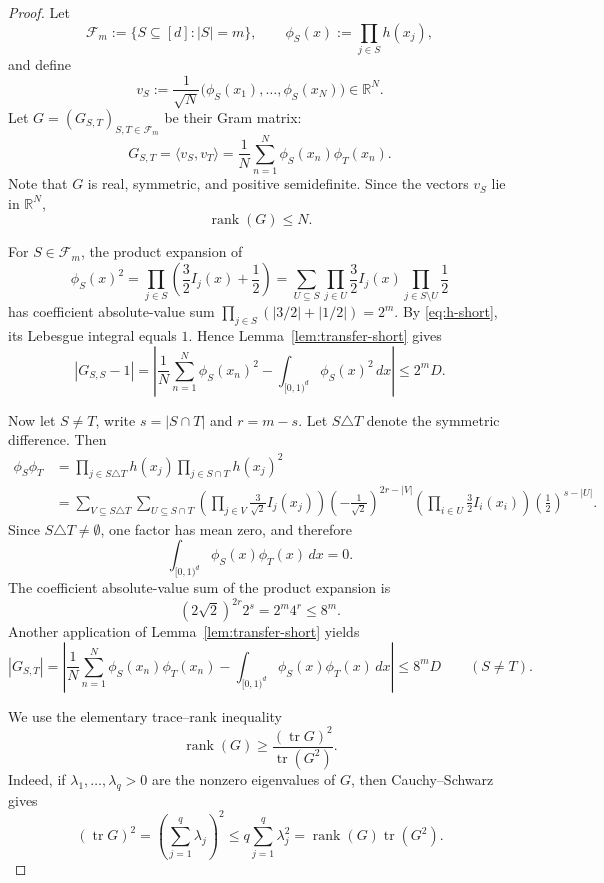 \documentclass[10pt,a4paper]{amsart}
\newcommand{\1}{\mathbf{1}}
\newcommand{\R}{\mathbb{R}}
\newcommand{\tr}{\operatorname{tr}}
\newcommand{\rank}{\operatorname{rank}}
\begin{document}
\begin{proof}
Let
\[
 \mathcal F_m:=\{S\subseteq[d]:|S|=m\},
 \qquad
 \phi_S(x):=\prod_{j\in S}h(x_j),
\]
and define
\[
 v_S:=\frac1{\sqrt N}
 \bigl(\phi_S(x_1),\dots,\phi_S(x_N)\bigr)\in\R^N.
\]
Let \(G=(G_{S,T})_{S,T\in\mathcal F_m}\) be their Gram matrix:
\[
 G_{S,T}
 =
 \langle v_S,v_T\rangle
 =
 \frac1N\sum_{n=1}^N\phi_S(x_n)\phi_T(x_n).
\] 
Note that $G$ is real, symmetric, and positive semidefinite.
Since the vectors \(v_S\) lie in \(\R^N\),
\begin{equation}\label{eq:rank-upper-short}
 \rank(G)\le N.
\end{equation}

For \(S\in\mathcal F_m\), the product expansion of
\[
 \phi_S(x)^2
 =
 \prod_{j\in S}
 \left(\frac32I_j(x)+\frac12\right) = \sum_{U \subseteq S} \prod_{j \in U} \frac32 I_j(x) \prod_{j \in S \setminus U} \frac12
\]
has coefficient absolute-value sum \(\prod_{j \in S} (|3/2| + |1/2|) = 2^m\).  By
\eqref{eq:h-short}, its Lebesgue integral equals \(1\).  Hence
Lemma~\ref{lem:transfer-short} gives
\begin{equation}\label{eq:diag-short}
 |G_{S,S}-1| = \left|\frac{1}{N} \sum_{n=1}^N \phi_S(x_n)^2 - \int_{[0,1)^d} \phi_S(x)^2 \,d x \right| \le 2^m D.
\end{equation}

Now let \(S\ne T\), write \(s=|S\cap T|\) and \(r=m-s\). Let $S \triangle T$ denote the symmetric difference. Then
\begin{align*}
 \phi_S\phi_T
 & =
 \prod_{j\in S\triangle T}h(x_j)
 \prod_{j\in S\cap T}h(x_j)^2  \\ & = \sum_{V \subseteq S \triangle T} \sum_{U \subseteq S \cap T} \left(\prod_{j \in V} \frac{3}{\sqrt{2}} I_j(x_j) \right) \left( -\frac{1}{\sqrt{2}} \right)^{2r - |V|} \left( \prod_{i \in U} \frac32 I_i(x_i) \right) \left( \frac12 \right)^{s - |U|}.
\end{align*}
Since \(S\triangle T\ne \emptyset \), one factor has mean zero, and
therefore
\[
 \int_{[0,1)^d}\phi_S(x)\phi_T(x)\,dx=0.
\]
The coefficient absolute-value sum of the product expansion is
\[
 (2\sqrt2)^{2r}2^s
 =2^m4^r
 \le8^m.
\]
Another application of Lemma~\ref{lem:transfer-short} yields
\begin{equation}\label{eq:offdiag-short}
 |G_{S,T}| = \left| \frac{1}{N} \sum_{n=1}^N \phi_S(x_n) \phi_T(x_n) - \int_{[0,1)^d} \phi_S(x) \phi_T(x) \,d x \right|  \le 8^m D
 \qquad(S\ne T).
\end{equation}

We use the elementary trace--rank inequality
\begin{equation}\label{eq:trace-rank-short}
 \rank(G)\ge\frac{(\tr G)^2}{\tr(G^2)}.
\end{equation}
Indeed, if \(\lambda_1,\dots,\lambda_q>0\) are the nonzero eigenvalues
of \(G\), then Cauchy--Schwarz gives
\[
 (\tr G)^2
 =
 \left(\sum_{j=1}^q\lambda_j\right)^2
 \le q\sum_{j=1}^q\lambda_j^2
 =
 \rank(G)\tr(G^2).
\]


\end{proof}
\end{document}
